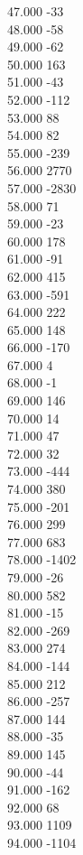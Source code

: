 { 47.000	-33 \\
 48.000	-58 \\
 49.000	-62 \\
 50.000	163 \\
 51.000	-43 \\
 52.000	-112 \\
 53.000	88 \\
 54.000	82 \\
 55.000	-239 \\
 56.000	2770 \\
 57.000	-2830 \\
 58.000	71 \\
 59.000	-23 \\
 60.000	178 \\
 61.000	-91 \\
 62.000	415 \\
 63.000	-591 \\
 64.000	222 \\
 65.000	148 \\
 66.000	-170 \\
 67.000	4 \\
 68.000	-1 \\
 69.000	146 \\
 70.000	14 \\
 71.000	47 \\
 72.000	32 \\
 73.000	-444 \\
 74.000	380 \\
 75.000	-201 \\
 76.000	299 \\
 77.000	683 \\
 78.000	-1402 \\
 79.000	-26 \\
 80.000	582 \\
 81.000	-15 \\
 82.000	-269 \\
 83.000	274 \\
 84.000	-144 \\
 85.000	212 \\
 86.000	-257 \\
 87.000	144 \\
 88.000	-35 \\
 89.000	145 \\
 90.000	-44 \\
 91.000	-162 \\
 92.000	68 \\
 93.000	1109 \\
 94.000	-1104 \\
}
